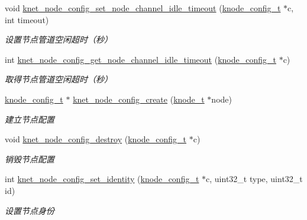 \begin{DoxyCompactItemize}
void \hyperlink{a00104_acd239745a361d6349e17c5fb34020d68_acd239745a361d6349e17c5fb34020d68}{knet\+\_\+node\+\_\+config\+\_\+set\+\_\+node\+\_\+channel\+\_\+idle\+\_\+timeout} (\hyperlink{a00066_af1cfaee0eb1c76ebf06076b95cc47ee1_af1cfaee0eb1c76ebf06076b95cc47ee1}{knode\+\_\+config\+\_\+t} $\ast$c, int timeout)
\begin{DoxyCompactList}\small\item\em 设置节点管道空闲超时（秒） \end{DoxyCompactList}\item 
int \hyperlink{a00104_aabef62af3c7a8b52c4943c0b30f70705_aabef62af3c7a8b52c4943c0b30f70705}{knet\+\_\+node\+\_\+config\+\_\+get\+\_\+node\+\_\+channel\+\_\+idle\+\_\+timeout} (\hyperlink{a00066_af1cfaee0eb1c76ebf06076b95cc47ee1_af1cfaee0eb1c76ebf06076b95cc47ee1}{knode\+\_\+config\+\_\+t} $\ast$c)
\begin{DoxyCompactList}\small\item\em 取得节点管道空闲超时（秒） \end{DoxyCompactList}\item 
\hyperlink{a00066_af1cfaee0eb1c76ebf06076b95cc47ee1_af1cfaee0eb1c76ebf06076b95cc47ee1}{knode\+\_\+config\+\_\+t} $\ast$ \hyperlink{a00104_aaec30b9e1634e9e28770dfaa6d96f327_aaec30b9e1634e9e28770dfaa6d96f327}{knet\+\_\+node\+\_\+config\+\_\+create} (\hyperlink{a00066_a5e720b27efbc9ad744240f5f4233763a_a5e720b27efbc9ad744240f5f4233763a}{knode\+\_\+t} $\ast$node)
\begin{DoxyCompactList}\small\item\em 建立节点配置 \end{DoxyCompactList}\item 
void \hyperlink{a00104_a5c440b19b4772a1dbbe699499560863d_a5c440b19b4772a1dbbe699499560863d}{knet\+\_\+node\+\_\+config\+\_\+destroy} (\hyperlink{a00066_af1cfaee0eb1c76ebf06076b95cc47ee1_af1cfaee0eb1c76ebf06076b95cc47ee1}{knode\+\_\+config\+\_\+t} $\ast$c)
\begin{DoxyCompactList}\small\item\em 销毁节点配置 \end{DoxyCompactList}\item 
int \hyperlink{a00104_af43c46c60f109257eea6dd1aee31d2f6_af43c46c60f109257eea6dd1aee31d2f6}{knet\+\_\+node\+\_\+config\+\_\+set\+\_\+identity} (\hyperlink{a00066_af1cfaee0eb1c76ebf06076b95cc47ee1_af1cfaee0eb1c76ebf06076b95cc47ee1}{knode\+\_\+config\+\_\+t} $\ast$c, uint32\+\_\+t type, uint32\+\_\+t id)
\begin{DoxyCompactList}\small\item\em 设置节点身份 \end{DoxyCompactList}\item 

\end{DoxyCompactItemize}
